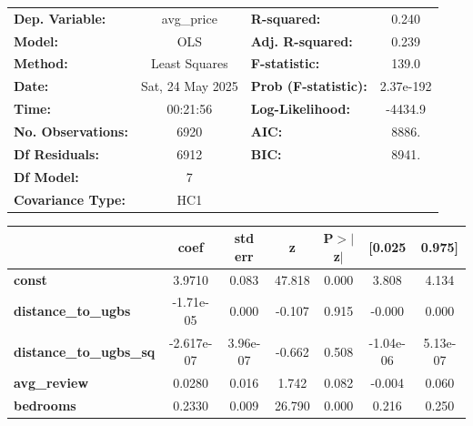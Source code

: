 \begin{center}
\begin{tabular}{lclc}
\toprule
\textbf{Dep. Variable:}         &    avg\_price    & \textbf{  R-squared:         } &     0.240   \\
\textbf{Model:}                 &       OLS        & \textbf{  Adj. R-squared:    } &     0.239   \\
\textbf{Method:}                &  Least Squares   & \textbf{  F-statistic:       } &     139.0   \\
\textbf{Date:}                  & Sat, 24 May 2025 & \textbf{  Prob (F-statistic):} & 2.37e-192   \\
\textbf{Time:}                  &     00:21:56     & \textbf{  Log-Likelihood:    } &   -4434.9   \\
\textbf{No. Observations:}      &        6920      & \textbf{  AIC:               } &     8886.   \\
\textbf{Df Residuals:}          &        6912      & \textbf{  BIC:               } &     8941.   \\
\textbf{Df Model:}              &           7      & \textbf{                     } &             \\
\textbf{Covariance Type:}       &       HC1        & \textbf{                     } &             \\
\bottomrule
\end{tabular}
\begin{tabular}{lcccccc}
                                & \textbf{coef} & \textbf{std err} & \textbf{z} & \textbf{P$> |$z$|$} & \textbf{[0.025} & \textbf{0.975]}  \\
\midrule
\textbf{const}                  &       3.9710  &        0.083     &    47.818  &         0.000        &        3.808    &        4.134     \\
\textbf{distance\_to\_ugbs}     &    -1.71e-05  &        0.000     &    -0.107  &         0.915        &       -0.000    &        0.000     \\
\textbf{distance\_to\_ugbs\_sq} &   -2.617e-07  &     3.96e-07     &    -0.662  &         0.508        &    -1.04e-06    &     5.13e-07     \\
\textbf{avg\_review}            &       0.0280  &        0.016     &     1.742  &         0.082        &       -0.004    &        0.060     \\
\textbf{bedrooms}               &       0.2330  &        0.009     &    26.790  &         0.000        &        0.216    &        0.250     \\

\end{tabular}
\end{center}
